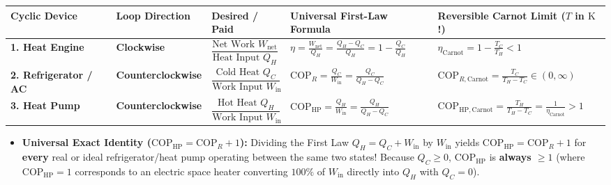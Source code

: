 \begin{formulacard}
\par\smallskip\noindent
\footnotesize\setlength{\tabcolsep}{3.5pt}\renewcommand{\arraystretch}{1.20}
\begin{tabularx}{\linewidth}{@{}l l l l X@{}}
\toprule
\textbf{Cyclic Device} & \textbf{Loop Direction} & \textbf{Desired / Paid} & \textbf{Universal First-Law Formula} & \textbf{Reversible Carnot Limit ($T$ in $\si{\kelvin}$!)} \\
\midrule
\textbf{1. Heat Engine} & \textbf{Clockwise} & $\dfrac{\text{Net Work } W_{\mathrm{net}}}{\text{Heat Input } Q_H}$ & $\displaystyle \eta = \frac{W_{\mathrm{net}}}{Q_H} = \frac{Q_H - Q_C}{Q_H} = 1 - \frac{Q_C}{Q_H}$ & $\displaystyle \eta_{\mathrm{Carnot}} = 1 - \frac{T_C}{T_H} < 1$ \\[7pt]
\textbf{2. Refrigerator / AC} & \textbf{Counterclockwise} & $\dfrac{\text{Cold Heat } Q_C}{\text{Work Input } W_{\mathrm{in}}}$ & $\displaystyle \mathrm{COP}_R = \frac{Q_C}{W_{\mathrm{in}}} = \frac{Q_C}{Q_H - Q_C}$ & $\displaystyle \mathrm{COP}_{R,\mathrm{Carnot}} = \frac{T_C}{T_H - T_C} \in (0,\infty)$ \\[7pt]
\textbf{3. Heat Pump} & \textbf{Counterclockwise} & $\dfrac{\text{Hot Heat } Q_H}{\text{Work Input } W_{\mathrm{in}}}$ & $\displaystyle \mathrm{COP}_{\mathrm{HP}} = \frac{Q_H}{W_{\mathrm{in}}} = \frac{Q_H}{Q_H - Q_C}$ & $\displaystyle \mathrm{COP}_{\mathrm{HP,Carnot}} = \frac{T_H}{T_H - T_C} = \frac{1}{\eta_{\mathrm{Carnot}}} > 1$ \\
\bottomrule
\end{tabularx}
\par\smallskip\noindent
{}
\begin{itemize}
  \item \textbf{Universal Exact Identity ($\mathrm{COP}_{\mathrm{HP}} = \mathrm{COP}_R + 1$):} Dividing the First Law $Q_H = Q_C + W_{\mathrm{in}}$ by $W_{\mathrm{in}}$ yields $\boxed{\mathrm{COP}_{\mathrm{HP}} = \mathrm{COP}_R + 1}$ for \textbf{every} real or ideal refrigerator/heat pump operating between the same two states! Because $Q_C \ge 0$, $\mathrm{COP}_{\mathrm{HP}}$ is \textbf{always $\ge 1$} (where $\mathrm{COP}_{\mathrm{HP}} = 1$ corresponds to an electric space heater converting $100\%$ of $W_{\mathrm{in}}$ directly into $Q_H$ with $Q_C = 0$).

\end{itemize}
\end{formulacard}
